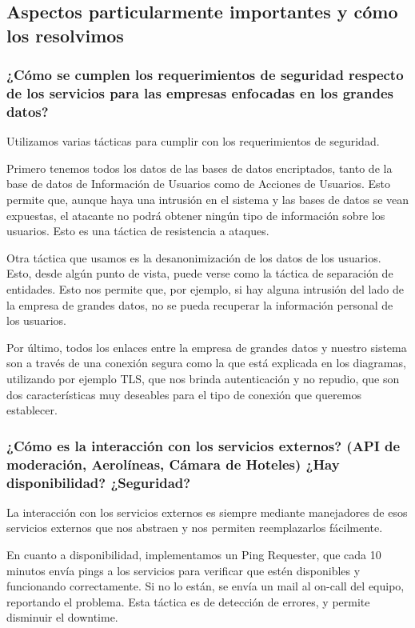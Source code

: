 \subsection{Aspectos particularmente importantes y cómo los resolvimos}

\subsubsection{¿Cómo se cumplen los requerimientos de seguridad respecto de los servicios para las empresas enfocadas en los grandes datos?}

Utilizamos varias tácticas para cumplir con los requerimientos de seguridad.

Primero tenemos todos los datos de las bases de datos encriptados, tanto de la base de datos de Información de Usuarios como de Acciones de Usuarios. Esto permite que, aunque haya una intrusión en el sistema y las bases de datos se vean expuestas, el atacante no podrá obtener ningún tipo de información sobre los usuarios. Esto es una táctica de resistencia a ataques.

Otra táctica que usamos es la desanonimización de los datos de los usuarios. Esto, desde algún punto de vista, puede verse como la táctica de separación de entidades. Esto nos permite que, por ejemplo, si hay alguna intrusión del lado de la empresa de grandes datos, no se pueda recuperar la información personal de los usuarios.

Por último, todos los enlaces entre la empresa de grandes datos y nuestro sistema son a través de una conexión segura como la que está explicada en los diagramas, utilizando por ejemplo TLS, que nos brinda autenticación y no repudio, que son dos características muy deseables para el tipo de conexión que queremos establecer.

\subsubsection{¿Cómo es la interacción con los servicios externos? (API de moderación, Aerolíneas, Cámara de Hoteles) ¿Hay disponibilidad? ¿Seguridad?}

La interacción con los servicios externos es siempre mediante manejadores de esos servicios externos que nos abstraen y nos permiten reemplazarlos fácilmente.

En cuanto a disponibilidad, implementamos un Ping Requester, que cada 10 minutos envía pings a los servicios para verificar que estén disponibles y funcionando correctamente. Si no lo están, se envía un mail al on-call del equipo, reportando el problema. Esta táctica es de detección de errores, y permite disminuir el downtime.

